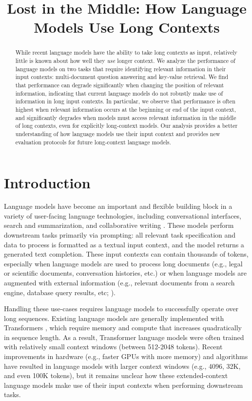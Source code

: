 \title{Lost in the Middle: How Language Models Use Long Contexts}

\begin{abstract}
While recent language models have the ability to take long contexts as input, relatively little is known about how well they \textit{use} longer context. We analyze the performance of language models on two tasks that require identifying relevant information in their input contexts: multi-document question answering and key-value retrieval. We find that performance can degrade significantly when changing the position of relevant information, indicating that current language models do not robustly make use of information in long input contexts. In particular, we observe that performance is often highest when relevant information occurs at the beginning or end of the input context, and significantly degrades when models must access relevant information in the middle of long contexts, even for explicitly long-context models. Our analysis provides a better understanding of how language models use their input context and provides new evaluation protocols for future long-context language models.
\end{abstract}

\section{Introduction}

Language models have become an important and flexible building block in a variety of user-facing language technologies, including conversational interfaces, search and summarization, and collaborative writing \citep[\emph{inter alia}]{shuster2022blenderbot,thoppilan2022lamda,lee2022coauthor}. These models perform downstream tasks primarily via prompting: all relevant task specification and data to process is formatted as a textual input context, and the model returns a generated text completion. These input contexts can contain thousands of tokens, especially when language models are used to process long documents (e.g., legal or scientific documents, conversation histories, etc.) or when language models are augmented with external information (e.g., relevant documents from a search engine, database query results, etc; \citealp[\emph{inter alia}]{petroni2020context,ram2023incontext,shi2023replug,mallen2023trust,schick2023toolformer}).

Handling these use-cases requires language models to successfully operate over long sequences. Existing language models are generally implemented with Transformers \citep{10.5555/3295222.3295349}, which require memory and compute that increases quadratically in sequence length. As a result, Transformer language models were often trained with relatively small context windows (between 512-2048 tokens). Recent improvements in hardware (e.g., faster GPUs with more memory) and algorithms \citep[\emph{inter alia}]{dai-etal-2019-transformer,dao2022flashattention,poli2023hyena,rubin2023longrange} have resulted in language models with larger context windows (e.g., 4096, 32K, and even 100K tokens), but it remains unclear how these extended-context language models make use of their input contexts when performing downstream tasks.

